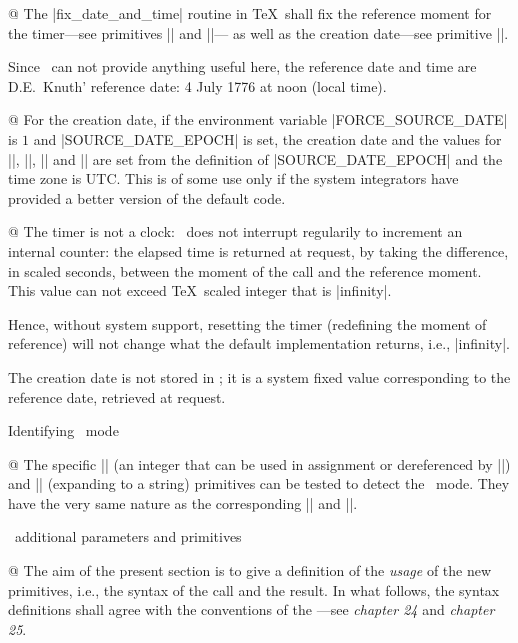 @ The |fix_date_and_time| routine in \TeX\ shall fix the reference
moment for the timer---see primitives |\elapsedtime| and |\resettimer|---
as well as the creation date---see primitive |\creationdate|.

Since \PASCAL\ can not provide anything useful here, the reference date
and time are D.E.~Knuth' reference date: 4 July 1776 at noon (local
time).

@ For the creation date, if the environment variable |FORCE_SOURCE_DATE|
is $1$ and |SOURCE_DATE_EPOCH| is set, the creation date and the values
for |\year|, |\month|, |\day| and |\time| are set from the definition of
|SOURCE_DATE_EPOCH| and the time zone is UTC. This is of some use only
if the system integrators have provided a better version of the default
code.

@ The timer is not a clock: \Prote\ does not interrupt regularily to
increment an internal counter: the elapsed time is returned at request,
by taking the difference, in scaled seconds, between the moment of the
call and the reference moment. This value can not exceed \TeX\ scaled
integer that is |infinity|.

Hence, without system support, resetting the timer (redefining the
moment of reference) will not change what the default implementation
returns, i.e., |infinity|.

The creation date is not stored in \Prote; it is a system fixed value
corresponding to the reference date, retrieved at request.

\enddiv %

\enddiv %

\begindiv Identifying \Prote\ mode

@ The specific |\Proteversion| (an integer that can be used in
assignment or dereferenced by |\the|) and |\Proterevision| (expanding to
a string) primitives can be tested to detect the \Prote\ mode. They
have the very same nature as the corresponding |\eTeXversion| and
|\eTeXrevision|.

\enddiv %

\begindiv \Prote\ additional parameters and primitives

@ The aim of the present section is to give a definition of the {\sl
usage} of the new primitives, i.e., the syntax of the call and the
result. In what follows, the syntax definitions shall agree with the
conventions of the \TeXbook---see {\sl chapter 24} and {\sl chapter 25}.


